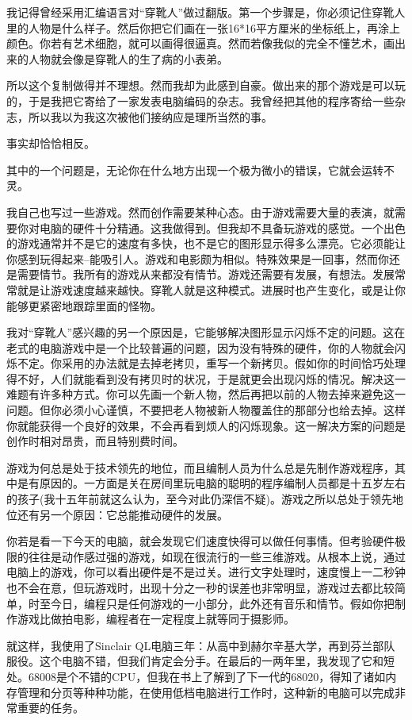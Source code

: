 我记得曾经采用汇编语言对“穿靴人”做过翻版。第一个步骤是，你必须记住穿靴人里的人物是什么样子。然后你把它们画在一张16*16平方厘米的坐标纸上，再涂上颜色。你若有艺术细胞，就可以画得很逼真。然而若像我似的完全不懂艺术，画出来的人物就会像是穿靴人的生了病的小表弟。

所以这个复制做得并不理想。然而我却为此感到自豪。做出来的那个游戏是可以玩的，于是我把它寄给了一家发表电脑编码的杂志。我曾经把其他的程序寄给一些杂志，所以我以为我这次被他们接纳应是理所当然的事。

事实却恰恰相反。

其中的一个问题是，无论你在什么地方出现一个极为微小的错误，它就会运转不灵。

我自己也写过一些游戏。然而创作需要某种心态。由于游戏需要大量的表演，就需要你对电脑的硬件十分精通。这我做得到。但我却不具备玩游戏的感觉。一个出色的游戏通常并不是它的速度有多快，也不是它的图形显示得多么漂亮。它必须能让你感到玩得起来--能吸引人。游戏和电影颇为相似。特殊效果是一回事，然而你还是需要情节。我所有的游戏从来都没有情节。游戏还需要有发展，有想法。发展常常就是让游戏速度越来越快。穿靴人就是这种模式。进展时也产生变化，或是让你能够更紧密地跟踪里面的怪物。

我对“穿靴人”感兴趣的另一个原因是，它能够解决图形显示闪烁不定的问题。这在老式的电脑游戏中是一个比较普遍的问题，因为没有特殊的硬件，你的人物就会闪烁不定。你采用的办法就是去掉老拷贝，重写一个新拷贝。假如你的时间恰巧处理得不好，人们就能看到没有拷贝时的状况，于是就更会出现闪烁的情况。解决这一难题有许多种方式。你可以先画一个新人物，然后再把以前的人物去掉来避免这一问题。但你必须小心谨慎，不要把老人物被新人物覆盖住的那部分也给去掉。这样你就能获得一个良好的效果，不会再看到烦人的闪烁现象。这一解决方案的问题是创作时相对昂贵，而且特别费时间。

游戏为何总是处于技术领先的地位，而且编制人员为什么总是先制作游戏程序，其中是有原因的。一方面是关在房间里玩电脑的聪明的程序编制人员都是十五岁左右的孩子(我十五年前就这么认为，至今对此仍深信不疑)。游戏之所以总处于领先地位还有另一个原因：它总能推动硬件的发展。

你若是看一下今天的电脑，就会发现它们速度快得可以做任何事情。但考验硬件极限的往往是动作感过强的游戏，如现在很流行的一些三维游戏。从根本上说，通过电脑上的游戏，你可以看出硬件是不是过关。进行文字处理时，速度慢上一二秒钟也不会在意，但玩游戏时，出现十分之一秒的误差也非常明显，游戏过去都比较简单，时至今日，编程只是任何游戏的一小部分，此外还有音乐和情节。假如你把制作游戏比做拍电影，编程者在一定程度上就等同于摄影师。

就这样，我使用了Sinclair QL电脑三年：从高中到赫尔辛基大学，再到芬兰部队服役。这个电脑不错，但我们肯定会分手。在最后的一两年里，我发现了它和短处。68008是个不错的CPU，但我在书上了解到了下一代的68020，得知了诸如内存管理和分页等种种功能，在使用低档电脑进行工作时，这种新的电脑可以完成非常重要的任务。


